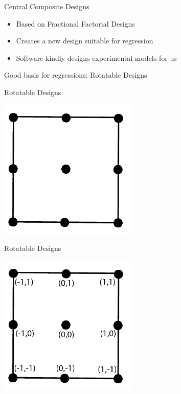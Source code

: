 \documentclass[14pt]{beamer}
\begin{document}
\begin{frame}{Central Composite Designs}
\pause
\begin{itemize}
\item Based on Fractional Factorial Designs
\vspace{0.5cm}
\pause
\item Creates a new design suitable for regression
\vspace{0.5cm}
\pause
\item Software kindly designs experimental models for us
\end{itemize}
\vspace{1cm}
\pause
Good basis for regressions: Rotatable Designs


\end{frame}

\begin{frame}{Rotatable Designs}
\pause
\begin{center}
\includegraphics[width=0.5\textwidth]{3level2factor.png}
\end{center}
\end{frame}

\begin{frame}{Rotatable Designs}
\begin{center}
\includegraphics[width=0.5\textwidth]{3level2factoranno.png}
\end{center}
\end{frame}
\end{document}
